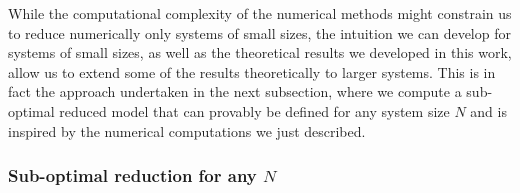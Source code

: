 \documentclass[aihp,12pt]{imsart}
\theoremstyle{theorem}
\theoremstyle{definition}
\theoremstyle{remark}
\begin{document}
While the computational complexity of the numerical methods might constrain us to reduce numerically only systems of small sizes, the intuition we can develop for systems of small sizes, as well as the theoretical results we developed in this work, allow us to extend some of the results theoretically to larger systems. This is in fact the approach undertaken in the next subsection, where we compute a sub-optimal reduced model that can provably be defined for any system size $N$ and is inspired by the numerical computations we just described.    

\subsubsection{Sub-optimal reduction for any $N$}\label{sec:scalableex}
\end{document}
